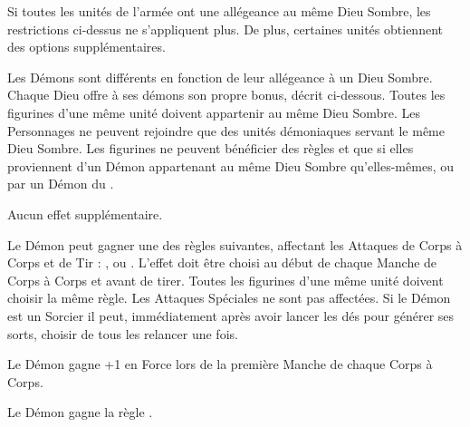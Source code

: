 \armyspecialruleentry{\monotheistarmybonus}

Si toutes les unités de l'armée ont une allégeance au même Dieu Sombre, les restrictions ci-dessus ne s'appliquent plus. De plus, certaines unités obtiennent des options supplémentaires.

\closearmywiderules









\newpage
\startarmyspecialrules

\armyspecialruleentry{\daemonofthedarkgods}

Les Démons sont différents en fonction de leur allégeance à un Dieu Sombre. Chaque Dieu offre à ses démons son propre bonus, décrit ci-dessous. Toutes les figurines d'une même unité doivent appartenir au même Dieu Sombre. Les Personnages ne peuvent rejoindre que des unités démoniaques servant le même Dieu Sombre. Les figurines ne peuvent bénéficier des règles \holdyourground{} et \inspiringpresence{} que si elles proviennent d'un Démon appartenant au même Dieu Sombre qu'elles-mêmes, ou par un Démon du \truechaos{}.

\spacebetweenalliance{}

\hfill{}
Aucun effet supplémentaire.
\allianceclosesidetext{}

\spacebetweenalliance{}

Le Démon peut gagner une des règles suivantes, affectant les Attaques de Corps à Corps et de Tir : \divineattacks{}, \flamingattacks{} ou \hellfire{}. L'effet doit être choisi au début de chaque Manche de Corps à Corps et avant de tirer. Toutes les figurines d'une même unité doivent choisir la même règle. Les Attaques Spéciales ne sont pas affectées. Si le Démon est un Sorcier il peut, immédiatement après avoir lancer les dés pour générer ses sorts, choisir de tous les relancer une fois.
\allianceclosesidetext{}\hfill
{}

\spacebetweenalliance{}

\hfill{}
Le Démon gagne +1 en Force lors de la première Manche de chaque Corps à Corps.
\allianceclosesidetext{}

\spacebetweenalliance{}

Le Démon gagne la règle .
\allianceclosesidetext{}\hfill
{}

